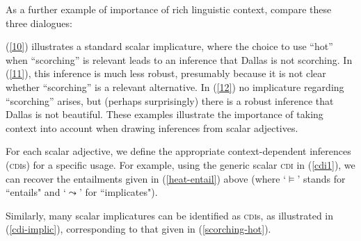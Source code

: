 \documentclass[10pt]{article}
\begin{document}
As a further example of importance of rich linguistic context, compare these three dialogues: 
 \vspace{-.1in}
\begin{multicols}{3}
\end{multicols}
 \vspace{-.1in}
\noindent
(\ref{10}) illustrates a standard scalar implicature, where the choice to use ``hot'' when ``scorching'' is relevant leads to an inference that Dallas is not scorching. In (\ref{11}), this inference is much less robust, presumably because it is not clear whether ``scorching'' is a relevant alternative. In (\ref{12}) no implicature regarding ``scorching'' arises, but (perhaps surprisingly) there is a robust inference that Dallas is not beautiful. These examples illustrate the importance of taking context into account when drawing inferences from scalar adjectives. 

For each scalar adjective, we define the appropriate context-dependent inferences (\textsc{cdi}s) for a specific usage. 
For example, using the generic scalar \textsc{cdi} in (\ref{cdi1}), we can  recover the entailments given in (\ref{heat-entail}) above (where `$\vDash$' stands for ``entails" and `$\leadsto$'  for ``implicates"). 

\vspace{-0.5em}
\vspace{-0.5em}

\noindent Similarly, many   scalar implicatures   can be identified as 
 \textsc{cdi}s, as illustrated in (\ref{cdi-implic}), corresponding to that given in (\ref{scorching-hot}). 
\end{document}
